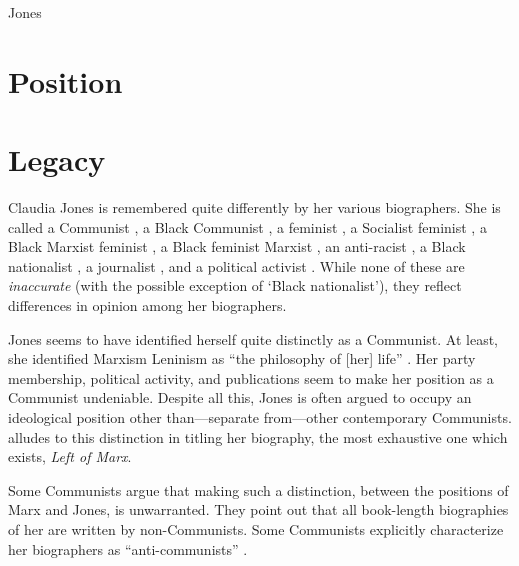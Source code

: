 \documentclass[man,12pt,natbib]{apa6}
\begin{document}
Jones 

\section{Position}


\section{Legacy}

Claudia Jones is remembered quite differently by her various biographers. She
is called a Communist \cite{Lalkar, Davis15}, a Black Communist
\citep{Davies08, Howard13, McKittrick08}, a feminist \citep{Davis15,
McClendon96}, a Socialist feminist \cite{Lynn14}, a Black Marxist feminist
\citep{OBrien14}, a Black feminist Marxist \citep{Johnson08}, an anti-racist
\citep{Davis15}, a Black nationalist \citep{McClendon96}, a journalist
\citep{Hinds08, McClendon96}, and a political activist \citep{McClendon96}.
While none of these are \emph{inaccurate} (with the possible exception of
`Black nationalist'), they reflect differences in opinion among her
biographers.

Jones seems to have identified herself quite distinctly as a Communist. At least,
she identified Marxism Leninism as ``the philosophy of [her] life''
\citep{Lalkar, Carter86}.  Her party membership, political activity, and 
publications seem to make her position as a Communist undeniable. Despite all this,
Jones is often argued to occupy an ideological position other than---separate
from---other contemporary Communists. \citet{Davies08} alludes to this
distinction in titling her biography, the most exhaustive one which exists,
\emph{Left of Marx}.

Some Communists argue that making such a distinction, between the positions of
Marx and Jones, is unwarranted. They point out that all book-length biographies
of her \citep{Davies08, Sherwood00} are written by non-Communists. Some
Communists explicitly characterize her biographers as ``anti-communists''
\citep{Lalkar}.



\nocite{Azikiwe13}
\nocite{Davies08}
\nocite{Davies11}
\nocite{Davis15}
\nocite{Haan13}
\nocite{Hinds08}
\nocite{Howard13}
\nocite{Johnson08}
\nocite{Johnson84}
\nocite{Jones49a}
\nocite{Jones49b}
\nocite{Keith13}
\nocite{Lalkar}
\nocite{Lynn14}
\nocite{Mahamdallie04}
\nocite{McClendon96}
\nocite{McDuffie11}
\nocite{McKittrick08}
\nocite{OBrien14}
\nocite{Olende14}
\nocite{Shabazz09}
\nocite{Sherwood00}
\nocite{Taylor08}
\nocite{Thomson09}
\nocite{Washington03}
\nocite{Weigand01}

\clearpage

\end{document}
